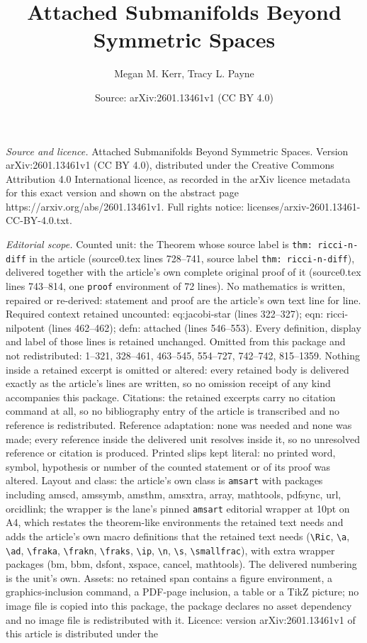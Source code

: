 \documentclass[10pt,a4paper]{amsart}
\title[Attached Submanifolds Beyond Symmetric Spaces]{Attached Submanifolds Beyond Symmetric Spaces}
\author{Megan M. Kerr, Tracy L. Payne}
\date{Source: arXiv:2601.13461v1 (CC BY 4.0)}
\begin{document}
\maketitle

\noindent\emph{Source and licence.} Attached Submanifolds Beyond Symmetric Spaces. Version arXiv:2601.13461v1 (CC BY 4.0), distributed under the Creative Commons Attribution 4.0 International licence, as recorded in the arXiv licence metadata for this exact version and shown on the abstract page https://arxiv.org/abs/2601.13461v1. Full rights notice: licenses/arxiv-2601.13461-CC-BY-4.0.txt.\par\smallskip

\noindent\textit{Editorial scope.} Counted unit: the Theorem whose source label is \texttt{thm: ricci-n-diff} in the article (source0.tex lines 728--741, source label \texttt{thm: ricci-n-diff}), delivered together with the article's own complete original proof of it (source0.tex lines 743--814, one \texttt{proof} environment of 72 lines). No mathematics is written, repaired or re-derived: statement and proof are the article's own text line for line. Required context retained uncounted: eq:jacobi-star (lines 322--327); eqn: ricci-nilpotent (lines 462--462); defn: attached (lines 546--553). Every definition, display and label of those lines is retained unchanged. Omitted from this package and not redistributed: 1--321, 328--461, 463--545, 554--727, 742--742, 815--1359. Nothing inside a retained excerpt is omitted or altered: every retained body is delivered exactly as the article's lines are written, so no omission receipt of any kind accompanies this package. Citations: the retained excerpts carry no citation command at all, so no bibliography entry of the article is transcribed and no reference is redistributed. Reference adaptation: none was needed and none was made; every reference inside the delivered unit resolves inside it, so no unresolved reference or citation is produced. Printed slips kept literal: no printed word, symbol, hypothesis or number of the counted statement or of its proof was altered. Layout and class: the article's own class is \texttt{amsart} with packages including amscd, amssymb, amsthm, amsxtra, array, mathtools, pdfsync, url, orcidlink; the wrapper is the lane's pinned \texttt{amsart} editorial wrapper at 10pt on A4, which restates the theorem-like environments the retained text needs and adds the article's own macro definitions that the retained text needs (\texttt{\textbackslash Ric}, \texttt{\textbackslash a}, \texttt{\textbackslash ad}, \texttt{\textbackslash fraka}, \texttt{\textbackslash frakn}, \texttt{\textbackslash fraks}, \texttt{\textbackslash ip}, \texttt{\textbackslash n}, \texttt{\textbackslash s}, \texttt{\textbackslash smallfrac}), with extra wrapper packages (bm, bbm, dsfont, xspace, cancel, mathtools). The delivered numbering is the unit's own. Assets: no retained span contains a figure environment, a graphics-inclusion command, a PDF-page inclusion, a table or a TikZ picture; no image file is copied into this package, the package declares no asset dependency and no image file is redistributed with it. Licence: version arXiv:2601.13461v1 of this article is distributed under the 
\end{document}
